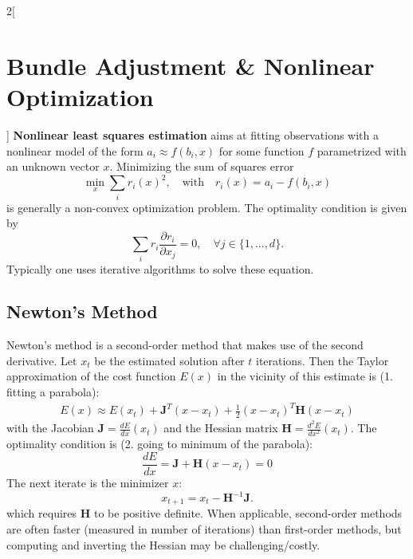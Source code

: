 \documentclass[oneside,fontsize=11pt,paper=a4]{scrartcl}
\begin{document}
\begin{multicols}{2}[\section{Bundle Adjustment \& Nonlinear Optimization}]
\textbf{Nonlinear least squares estimation} aims at fitting observations with a nonlinear model of the form $a_i \approx f(b_i, x)$ for some function $f$ parametrized with an unknown vector $x$.
Minimizing the sum of squares error
\begin{equation*}
    \min_{x} \sum_i r_i (x)^2, \quad \text{with} \quad r_i(x)=a_i-f(b_i,x)
\end{equation*}
is generally a non-convex optimization problem. The optimality condition is given by
\begin{equation*}
    \sum_i r_i \frac{\partial r_i}{\partial x_j} = 0, \quad \forall j \in \{1,...,d\}.
\end{equation*}
Typically one uses iterative algorithms to solve these equation.


\subsection{Newton's Method}
Newton's method is a second-order method that makes use of the second derivative. Let $x_t$ be the estimated solution after $t$ iterations. Then the Taylor approximation of the cost function $E(x)$ in the vicinity of this estimate is (1. fitting a parabola):
\begin{equation*}
\begin{split}
    E(x) \approx E(x_t) + \mathbf{J}^T (x-x_t) + \frac{1}{2} (x-x_t)^T \boldsymbol{H} (x-x_t)
\end{split}
\end{equation*}
with the Jacobian $\mathbf{J} = \frac{dE}{dx}(x_t)$ and the Hessian matrix $\boldsymbol{H} = \frac{d^2E}{dx^2}(x_t)$.
The optimality condition is (2. going to minimum of the parabola):
\begin{equation*}
    \frac{dE}{dx} = \mathbf{J} + \boldsymbol{H} (x-x_t) = 0
\end{equation*}
The next iterate is the minimizer $x$:
\begin{equation*}
    x_{t+1} = x_t - \boldsymbol{H}^{-1} \mathbf{J}.
\end{equation*}
which requires $\boldsymbol{H}$ to be positive definite. When applicable, second-order methods are often faster (measured in number of iterations) than first-order methods, but  computing and inverting the Hessian may be challenging/costly.



\end{multicols}
\end{document}
